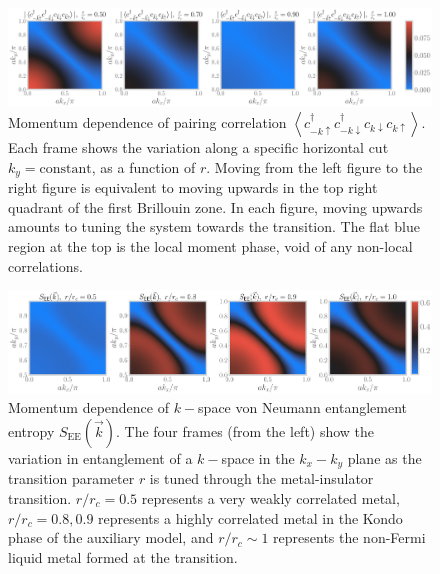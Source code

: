 \documentclass[reprint,hidelinks]{revtex4-2}
\begin{document}
\begin{figure}[!htb]
\includegraphics[width=\textwidth]{pair_rspace_all.pdf}
\caption{Momentum dependence of pairing correlation \(\left<c^\dagger_{-k\uparrow}c^\dagger_{-k\downarrow}c_{k\downarrow}c_{k\uparrow}\right>\). Each frame shows the variation along a specific horizontal cut \(k_y=\text{constant}\), as a function of \(r\). Moving from the left figure to the right figure is equivalent to moving upwards in the top right quadrant of the first Brillouin zone. In each figure, moving upwards amounts to tuning the system towards the transition. The flat blue region at the top is the local moment phase, void of any non-local correlations.}
\label{pair_kspace}
\end{figure}

\begin{figure}[!htb]
\includegraphics[width=\textwidth]{vne_kspace_all.pdf}
\caption{Momentum dependence of \(k-\)space von Neumann entanglement entropy \(S_\text{EE}(\vec k)\). The four frames (from the left) show the variation in entanglement of a \(k-\)space in the \(k_x-k_y\) plane as the transition parameter \(r\) is tuned through the metal-insulator transition. \(r/r_c=0.5\) represents a very weakly correlated metal, \(r/r_c=0.8,0.9\) represents a highly correlated metal in the Kondo phase of the auxiliary model, and \(r/r_c \sim 1\) represents the non-Fermi liquid metal formed at the transition.}
\label{entanglement_kspace}
\end{figure}
\end{document}
